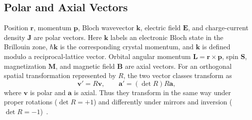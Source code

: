 \subsection{Polar and Axial Vectors}
\label{sec:polar-axial-vectors}

Position $\mathbf{r}$, momentum $\mathbf{p}$, Bloch wavevector $\mathbf{k}$,
electric field $\mathbf{E}$, and charge-current density $\mathbf{J}$ are polar
vectors.  Here $\mathbf{k}$ labels an electronic Bloch state in the Brillouin
zone, $\hbar\mathbf{k}$ is the corresponding crystal momentum, and $\mathbf{k}$
is defined modulo a reciprocal-lattice vector.  Orbital angular momentum
$\mathbf{L}=\mathbf{r}\times\mathbf{p}$, spin $\mathbf{S}$, magnetization
$\mathbf{M}$, and magnetic field $\mathbf{B}$ are axial vectors.  For an
orthogonal spatial transformation represented by $R$, the two vector classes
transform as
\begin{equation}
    \mathbf{v}'=R\mathbf{v},
    \qquad
    \mathbf{a}'=(\det R)R\mathbf{a},
    \label{eq:polar-axial-transformation}
\end{equation}
where $\mathbf{v}$ is polar and $\mathbf{a}$ is axial.  Thus they transform in
the same way under proper rotations ($\det R=+1$) and differently under mirrors
and inversion ($\det R=-1$)~\cite{ee237-week11}.

